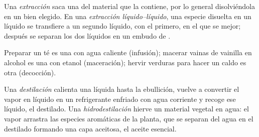 \begin{definition}\label{def:g10:chemical-species:extraction}
Una \emph{extracción} saca una  del
material que la contiene, por lo general disolviéndola en un 
bien elegido. En una
\emph{extracción líquido--líquido},
una especie disuelta en un líquido se transfiere a un segundo líquido,
 con el primero, en el que se  mejor; después se
separan los dos líquidos en un embudo de .
\end{definition}

\begin{example}\label{ex:g10:chemical-species:everyday}
Preparar un té es una  con agua caliente (infusión); macerar
vainas de vainilla en alcohol es una  con etanol (maceración);
hervir verduras para hacer un caldo es otra (decocción).
\end{example}


\begin{definition}\label{def:g10:chemical-species:distillation}
Una \emph{destilación} calienta una  líquida
hasta la ebullición, vuelve a convertir el vapor en líquido en un
refrigerante enfriado con agua corriente y recoge ese líquido, el
destilado. Una
\emph{hidrodestilación} hierve un material
vegetal en agua: el vapor arrastra las especies aromáticas de la planta,
que se separan del agua en el destilado formando una capa aceitosa, el
aceite esencial.
\end{definition}

